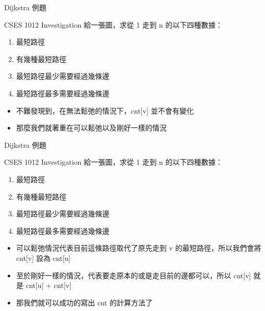 \documentclass[aspectratio=169]{beamer}
\begin{document}
    \begin{frame}{Dijkstra 例題}
        \begin{block}{CSES 1012 Investigation}
            給一張圖，求從 1 走到 n 的以下四種數據：
            \begin{enumerate}
                \item 最短路徑
                \item 有幾種最短路徑
                \item 最短路徑最少需要經過幾條邊
                \item 最短路徑最多需要經過幾條邊
            \end{enumerate}
        \end{block}

        \begin{itemize}
            \item<1-> 不難發現到，在無法鬆弛的情況下，cnt[v] 並不會有變化
            \item<2-> 那麼我們就著重在可以鬆弛以及剛好一樣的情況
        \end{itemize}
    \end{frame}

    \begin{frame}{Dijkstra 例題}
        \begin{block}{CSES 1012 Investigation}
            給一張圖，求從 1 走到 n 的以下四種數據：
            \begin{enumerate}
                \item 最短路徑
                \item 有幾種最短路徑
                \item 最短路徑最少需要經過幾條邊
                \item 最短路徑最多需要經過幾條邊
            \end{enumerate}
        \end{block}

        \begin{itemize}
            \item<1-> 可以鬆弛情況代表目前這條路徑取代了原先走到 v 的最短路徑，所以我們會將 cnt[v] 設為 cnt[u]
            \item<2-> 至於剛好一樣的情況，代表要走原本的或是走目前的邊都可以，所以 cnt[v] 就是 cnt[u] + cnt[v]
            \item<3-> 那我們就可以成功的寫出 cnt 的計算方法了
        \end{itemize}
    \end{frame}
\end{document}
